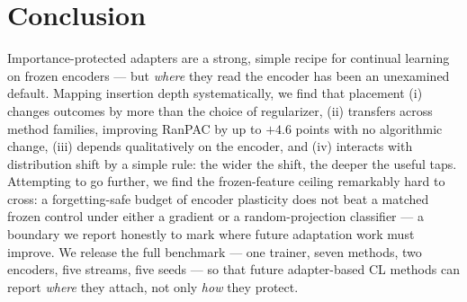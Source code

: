 \documentclass{article} %
\begin{document}
\section{Conclusion}
Importance-protected adapters are a strong, simple recipe for continual
learning on frozen encoders --- but \emph{where} they read the encoder has
been an unexamined default. Mapping insertion depth systematically, we find
that placement (i) changes outcomes by more than the choice of regularizer,
(ii) transfers across method families, improving RanPAC by up to $+4.6$ points
with no algorithmic change, (iii) depends qualitatively on the encoder, and
(iv) interacts with distribution shift by a simple rule: the wider the shift,
the deeper the useful taps. Attempting to go further, we find the frozen-feature
ceiling remarkably hard to cross: a forgetting-safe budget of encoder plasticity
does not beat a matched frozen control under either a gradient or a
random-projection classifier --- a boundary we report honestly to mark where
future adaptation work must improve. We release the full benchmark --- one
trainer, seven methods, two encoders, five streams, five seeds --- so that
future adapter-based CL methods can report \emph{where} they attach, not only
\emph{how} they protect.



\end{document}
